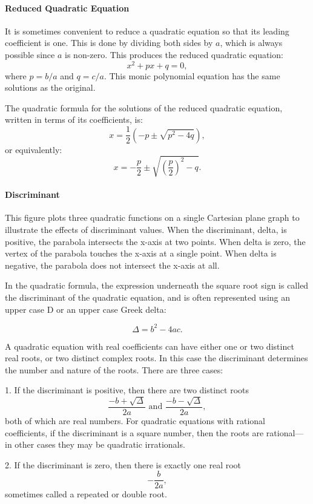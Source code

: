 \paragraph{Reduced Quadratic Equation}

It is sometimes convenient to reduce a quadratic equation so that its leading coefficient is one. This is done by dividing both sides by $a$, which is always possible since $a$ is non-zero. This produces the reduced quadratic equation:
$$
x^2 + px + q = 0,
$$
where $p = b/a$ and $q = c/a$. This monic polynomial equation has the same solutions as the original.

The quadratic formula for the solutions of the reduced quadratic equation, written in terms of its coefficients, is:
$$
x = \frac{1}{2} \left(-p \pm \sqrt{p^2 - 4q}\right),
$$
or equivalently:
$$
x = -\frac{p}{2} \pm \sqrt{\left(\frac{p}{2}\right)^2 - q}.
$$
\paragraph{Discriminant}

This figure plots three quadratic functions on a single Cartesian plane graph to illustrate the effects of discriminant values. When the discriminant, delta, is positive, the parabola intersects the x-axis at two points. When delta is zero, the vertex of the parabola touches the x-axis at a single point. When delta is negative, the parabola does not intersect the x-axis at all.


In the quadratic formula, the expression underneath the square root sign is called the discriminant of the quadratic equation, and is often represented using an upper case D or an upper case Greek delta:

$$\Delta = b^2 - 4ac.$$

A quadratic equation with real coefficients can have either one or two distinct real roots, or two distinct complex roots. In this case the discriminant determines the number and nature of the roots. There are three cases:

1. If the discriminant is positive, then there are two distinct roots
   $$\frac{-b + \sqrt{\Delta}}{2a} \text{ and } \frac{-b - \sqrt{\Delta}}{2a},$$
   both of which are real numbers. For quadratic equations with rational coefficients, if the discriminant is a square number, then the roots are rational—in other cases they may be quadratic irrationals.

2. If the discriminant is zero, then there is exactly one real root
   $$-\frac{b}{2a},$$
   sometimes called a repeated or double root.

